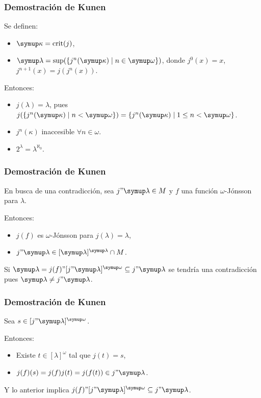 \documentclass{beamer}
\begin{document}
\begin{frame}
    \frametitle{Demostración de Kunen}

    Se definen:
    \begin{itemize}
        \item $\kappa=\crit{j}$,
        \item $\lambda=\sup(\set{j^n(\kappa)\mid n\in\omega})$, donde
            $j^0(x)=x$, $j^{n+1}(x) = j(j^{n}(x))$.
    \end{itemize}

    \pause
    Entonces:
    \begin{itemize}
        \item $j(\lambda) = \lambda$, pues
            $j(\set{j^n(\kappa)\mid n<\omega})
                = \set{j^n(\kappa)\mid 1\leq n<\omega}$.
        \item $j^n(\kappa)$ inaccesible $\forall n\in\omega$.
        \item $2^\lambda=\lambda^{\aleph_0}$.
    \end{itemize}
\end{frame}

\begin{frame}
    \frametitle{Demostración de Kunen}

    En busca de una contradicción, sea $j"\lambda\in M$ y
    $f$ una función $\omega$-Jónsson para $\lambda$.

    \pause
    Entonces:
    \begin{itemize}
        \item $j(f)$ es $\omega$-Jónsson para $j(\lambda)=\lambda$,
        \item $j"\lambda\in[\lambda]^\lambda\cap M$.
    \end{itemize}

    \pause
    Si $\lambda = j(f)"[j"\lambda]^\omega \subseteq j"\lambda$
    se tendría una contradicción pues $\lambda\neq j"\lambda$.
\end{frame}

\begin{frame}
    \frametitle{Demostración de Kunen}

    Sea $s\in [j"\lambda]^\omega$.

    \pause
    Entonces:
    \begin{itemize}
        \item Existe $t\in [\lambda]^\omega$ tal que $j(t) = s$,
        \item $j(f)(s) = j(f)j(t) = j(f(t)) \in j"\lambda$.
    \end{itemize}

    \pause
    Y lo anterior implica $j(f)"[j"\lambda]^\omega \subseteq j"\lambda$.
\end{frame}
\end{document}
